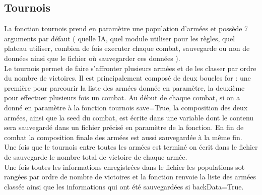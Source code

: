 \subsection{Tournois}
La fonction tournois prend en paramètre une population d'armées et possède 7 arguments par défaut ( quelle IA, quel module utiliser pour les règles, quel plateau utiliser, combien de fois executer chaque combat, sauvegarde ou non de données ainsi que le fichier où sauvegarder ces données ). \\
Le tournois permet de faire s'affronter plusieurs armées et de les classer par ordre du nombre de victoires. Il est principalement composé de deux boucles for : une première pour parcourir la liste des armées donnée en paramètre, la deuxième pour effectuer plusieurs fois un combat. Au début de chaque combat, si on a donné en paramètre à la fonction tournois save=True, la composition des deux armées, ainsi que la seed du combat, est écrite dans une variable dont le contenu sera sauvegardé dans un fichier précisé en paramètre de la fonction. En fin de combat la composition finale des armées est aussi sauvegardée à la même fin.\\
Une fois que le tournois entre toutes les armées est terminé on écrit dans le fichier de sauvegarde le nombre total de victoire de chaque armée. \\
Une fois toutes les informations enregistrées dans le fichier les populations sot rangées par ordre de nombre de victoires et la fonction renvoie la liste des armées classée ainsi que les informations qui ont été sauvegardées si backData=True.\\

